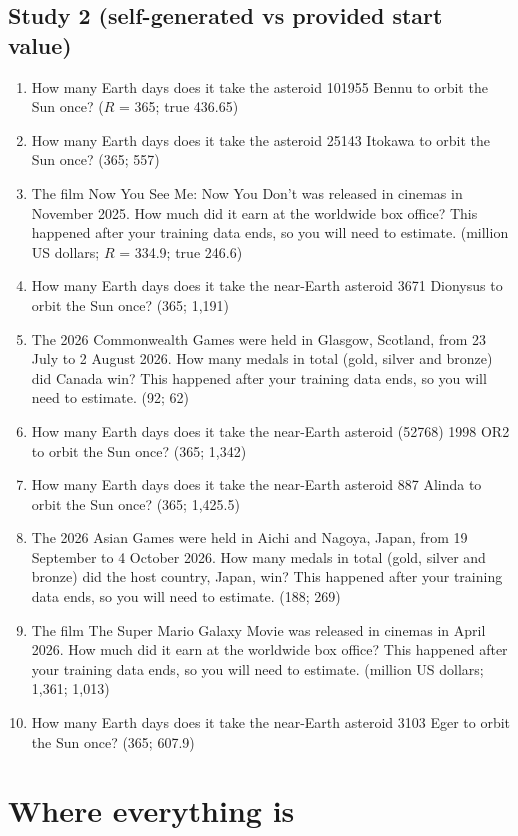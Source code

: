 \documentclass[11pt,a4paper]{article}
\begin{document}
\subsection*{Study 2 (self-generated vs provided start value)}
\begin{enumerate}[label=\arabic*., itemsep=1pt]
  \item How many Earth days does it take the asteroid 101955 Bennu to orbit the Sun once? ($R$ = 365; true 436.65)
  \item How many Earth days does it take the asteroid 25143 Itokawa to orbit the Sun once? (365; 557)
  \item The film Now You See Me: Now You Don't was released in cinemas in November 2025. How much did it earn at the worldwide box office? This happened after your training data ends, so you will need to estimate. (million US dollars; $R$ = 334.9; true 246.6)
  \item How many Earth days does it take the near-Earth asteroid 3671 Dionysus to orbit the Sun once? (365; 1,191)
  \item The 2026 Commonwealth Games were held in Glasgow, Scotland, from 23 July to 2 August 2026. How many medals in total (gold, silver and bronze) did Canada win? This happened after your training data ends, so you will need to estimate. (92; 62)
  \item How many Earth days does it take the near-Earth asteroid (52768) 1998 OR2 to orbit the Sun once? (365; 1,342)
  \item How many Earth days does it take the near-Earth asteroid 887 Alinda to orbit the Sun once? (365; 1,425.5)
  \item The 2026 Asian Games were held in Aichi and Nagoya, Japan, from 19 September to 4 October 2026. How many medals in total (gold, silver and bronze) did the host country, Japan, win? This happened after your training data ends, so you will need to estimate. (188; 269)
  \item The film The Super Mario Galaxy Movie was released in cinemas in April 2026. How much did it earn at the worldwide box office? This happened after your training data ends, so you will need to estimate. (million US dollars; 1,361; 1,013)
  \item How many Earth days does it take the near-Earth asteroid 3103 Eger to orbit the Sun once? (365; 607.9)
\end{enumerate}

\section{Where everything is}
\label{app:files}
\end{document}
